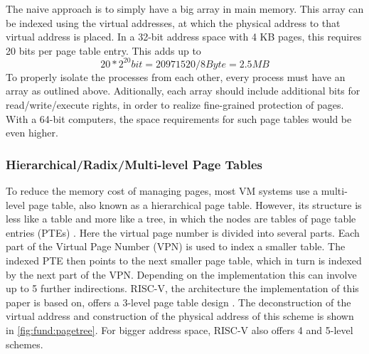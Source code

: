 The naive approach is to simply have a big array in main memory. This array can be indexed
using the virtual addresses, at which the physical address to that virtual address is placed.
In a 32-bit address space with 4 KB pages, this requires 20 bits per page table entry. This
adds up to \[ 20 * 2^{20} bit = 20971520 / 8 Byte = 2.5 MB \]
To properly isolate the processes from each other, every process must have an array as outlined above.
Aditionally, each array should include additional bits for read/write/execute rights, in order to realize fine-grained protection of pages.
With a 64-bit computers, the space requirements for such page tables would be even higher.

\subsubsection{Hierarchical/Radix/Multi-level Page Tables}
To reduce the memory cost of managing pages, most  VM systems use a
multi-level page table, also known as a hierarchical page table. However, its structure
is less like a table and more like a tree, in which the nodes are tables of page table entries (PTEs) \cite{tanenbaumOS}.
Here the virtual page number is divided into several parts. Each part of the Virtual Page Number (VPN)
is used to index a smaller table. The indexed PTE then points to the next smaller page table,
which in turn is indexed by the next part of the VPN. Depending on the implementation
this can involve up to 5 further indirections.
RISC-V, the architecture the implementation of this paper is based on, offers a 3-level page table
design \cite{riscvreader}.
The deconstruction of the virtual address and construction of the physical address of this
scheme is shown in \ref{fig:fund:pagetree}.
For bigger address space, RISC-V also offers 4 and 5-level schemes.

